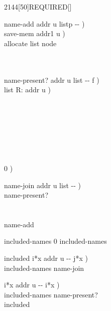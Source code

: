 \begin{worddef}{2144}[50]{REQUIRED}[]
\begin{implement}
		\word{:} name-add  addr u listp -{}- ) \\
		\tab {} save-mem  addr1 u ) \\
		     allocate list node \\
		\tab {}   \word{!}   \\
		\tab {}  \word{!}   \\
		\tab {}  \word{;}

		\word{:} name-present?  addr u list -{}- f ) \\
		\tab \word{ROT}     list R: addr u ) \\
		\tab[2]  \\
		\tab {} \\
		\tab[2]        \\
		\tab[3]		     \\
		\tab[2]	 \\
		\tab[2]  \\
		\tab {} \\
		\tab {}  0 )   \word{;}

		\word{:} name-join  addr u list -{}- ) \\
		\tab {}    name-present?  \\
		\tab[2]    \\
	    \tab {} \\
		\tab[2]  name-add \\
		\tab {} \word{;}

		 included-names 0 included-names \word{!}

		\word{:} included  i*x addr u -{}- j*x ) \\
		\tab {} included-names name-join \\
		\tab {} \word{;}

		\word{:}   i*x addr u -{}- i*x ) \\
		\tab {} included-names  name-present?   \\
		\tab[2] included \\
		\tab {} \\
		\tab[2]  \\
		\tab {} \word{;}
	\end{implement}


\end{worddef}
